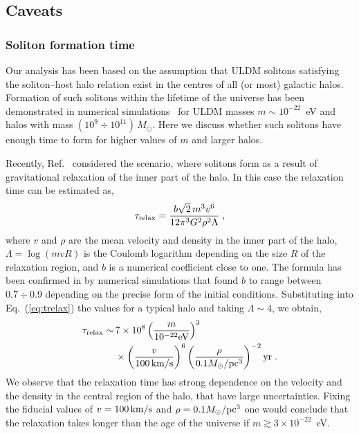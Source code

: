 \documentclass[aps,prd,floats,superscriptaddress,showpacs,nofootinbib,twocolumn,preprintnumbers]{revtex4-1}%
\def\be{\begin{eqnarray}}
\def\ee{\end{eqnarray}}
\begin{document}
\subsection{Caveats}

\subsubsection{Soliton formation time}
%
Our analysis has been based on the assumption that ULDM solitons
satisfying the soliton--host halo relation exist in the centres of all
(or most)
galactic halos. Formation of such solitons within the lifetime of the
universe has been demonstrated in numerical simulations~\cite{Schive:2014dra,Veltmaat:2018dfz} for ULDM masses $m\sim
10^{-22}$~eV and halos with mass $(10^9\div
10^{11})\,M_\odot$. Here we discuss whether such solitons have enough
time to form for higher values of $m$ and larger halos.

Recently, Ref.~\cite{Levkov:2018kau} considered the scenario, where
solitons form as a result of gravitational relaxation of the inner
part of the halo. In this case the relaxation time can be estimated
as,
\be
\label{eq:trelax}
\tau_{\rm relax}=\frac{b\sqrt{2}\,m^3 v^6}{12\pi^3G^2\rho^2\Lambda}\;,
\ee 
where $v$ and $\rho$ are the mean velocity and density in the
inner part of the halo, $\Lambda=\log(mv R)$ is the Coulomb logarithm depending
on the size $R$ of the relaxation region, and $b$ is a numerical
coefficient close to one. The formula has been confirmed in
\cite{Levkov:2018kau} by numerical simulations that found $b$ to range
between $0.7\div 0.9$ depending on the precise form of the initial
conditions. Substituting into Eq.~(\ref{eq:trelax}) the values for a
typical halo and taking $\Lambda\sim 4$, we obtain,
\be
\label{eq:trelaxnum}
\begin{split}
\tau_{\rm relax}\sim\, &7\times 10^8
\left(\frac{m}{10^{-22}{\rm eV}}\right)^3\\
&\times\left(\frac{v}{100\,{\rm km}/{\rm s}}\right)^6
\left(\frac{\rho}{0.1 M_\odot/{{\rm pc}^3}}\right)^{-2}
{\rm yr}\;.
\end{split}
\ee
We observe that the relaxation time has strong dependence on the
velocity and the density in the central region of the halo, that have
large uncertainties. Fixing the fiducial values of $v=100\,{\rm
  km}/{\rm s}$ and $\rho=0.1M_\odot/{\rm pc}^3$ one would conclude
that the relaxation takes longer than the age of the universe if
$m\gtrsim 3\times 10^{-22}$~eV.
\end{document}
